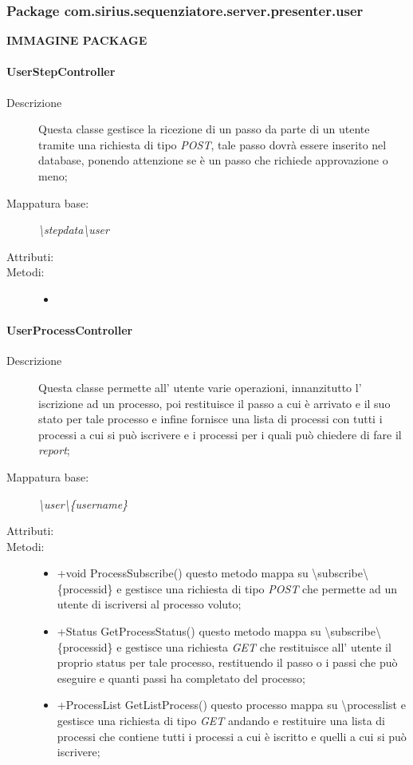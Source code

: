 \subsubsection{Package com.sirius.sequenziatore.server.presenter.user}
\textbf{IMMAGINE PACKAGE}
\paragraph{UserStepController}%
\begin{description}
	\item[Descrizione] Questa classe gestisce la ricezione di un passo da parte di un utente tramite una richiesta di tipo \textit{POST}, tale passo dovrà essere inserito nel database, ponendo attenzione se è un passo che richiede approvazione o meno;
	\item[Mappatura base:] \textit{\textbackslash stepdata\textbackslash user}
	\item[Attributi:]
	\item[Metodi:]\begin{itemize}
					\item 
				\end{itemize}
\end{description}
\paragraph{UserProcessController}%
\begin{description}
	\item[Descrizione] Questa classe permette all' utente varie operazioni, innanzitutto l' iscrizione ad un processo, poi restituisce il passo a cui è arrivato e il suo stato per tale processo e infine fornisce una lista di processi con tutti i processi a cui si può iscrivere e i processi per i quali può chiedere di fare il \textit{report};
	\item[Mappatura base:] \textit{\textbackslash user\textbackslash \{username\}}
	\item[Attributi:]
	\item[Metodi:]\begin{itemize}
					\item +void ProcessSubscribe() questo metodo mappa su \textbackslash subscribe\textbackslash \{processid\} e gestisce una richiesta di tipo \textit{POST} che permette ad un utente di iscriversi al processo voluto;
					\item +Status GetProcessStatus() questo metodo mappa su \textbackslash subscribe\textbackslash \{processid\} e gestisce una richiesta \textit{GET} che restituisce all' utente il proprio status per tale processo, restituendo il passo o i passi che può eseguire e quanti passi ha completato del processo;
					\item +ProcessList GetListProcess() questo processo mappa su \textbackslash processlist e gestisce una richiesta di tipo \textit{GET} andando e restituire una lista di processi che contiene tutti i processi  a cui è iscritto e quelli a cui si può iscrivere;
				\end{itemize}
\end{description}
